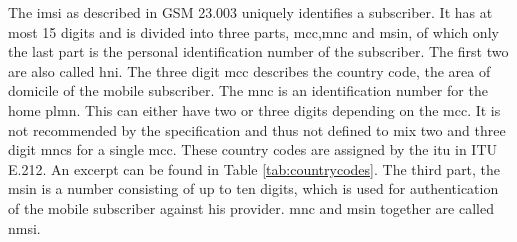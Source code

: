 The \gls{imsi} as described in GSM 23.003\cite{GSM23003} uniquely identifies a subscriber.
It has at most 15 digits and is divided into three parts, \gls{mcc},\gls{mnc} and \gls{msin}, of which only the last part is the personal identification number of the subscriber.
The first two are also called \gls{hni}.
The three digit \gls{mcc} describes the country code, the area of domicile of the mobile subscriber.
The \gls{mnc} is an identification number for the home \gls{plmn}.
This can either have two or three digits depending on the \gls{mcc}.
It is not recommended by the specification and thus not defined to mix two and three digit \gls{mnc}s for a single \gls{mcc}.
These country codes are assigned by the \gls{itu} in ITU E.212\cite{ITU212}.
An excerpt can be found in Table \ref{tab:countrycodes}.
The third part, the \gls{msin} is a number consisting of up to ten digits, which is used for authentication of the mobile subscriber against his provider.
\gls{mnc} and \gls{msin} together are called \gls{nmsi}.
\begin{table}
\centering
{}
\hspace{.5cm}
\caption{Mobile Country and Network Codes. (R) denotes that the MCC is reserved but not operational as of yet, whereas (T) denotes a operational test network.}
\label{tab:countrycodes}
\end{table}

